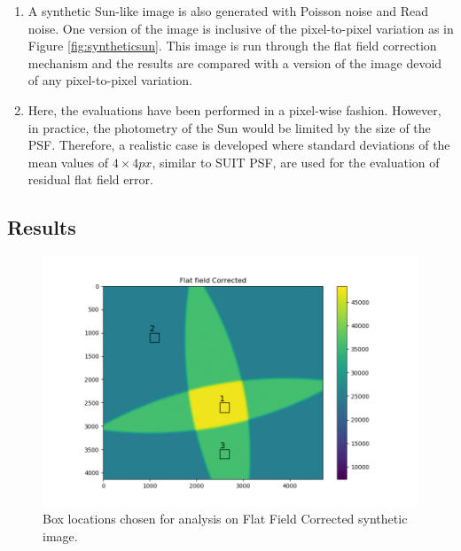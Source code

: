 \documentclass[11pt,a4paper]{article}
\begin{document}
\begin{enumerate}
				\item A synthetic Sun-like image is also generated with Poisson noise and Read noise. One version of the image is inclusive of the pixel-to-pixel variation as in Figure \ref{fig:syntheticsun}. This image is run through the flat field correction mechanism and the results are compared with a version of the image devoid of any pixel-to-pixel variation.
				
				\item Here, the evaluations have been performed in a pixel-wise fashion. However, in practice, the photometry of the Sun would be limited by the size of the PSF. Therefore, a realistic case is developed where standard deviations of the mean values of $4\times4 px$, similar to SUIT PSF, are used for the evaluation of residual flat field error. 
			\end{enumerate}
		
		
	
	\subsection{Results}
	\begin{figure}
		\centering
		\includegraphics[width=0.6\linewidth]{pics/analysis_locations.png}
		\caption{Box locations chosen for analysis on Flat Field Corrected synthetic image.}
		\label{fig:analysislocations}
	\end{figure}
	
\end{document}
